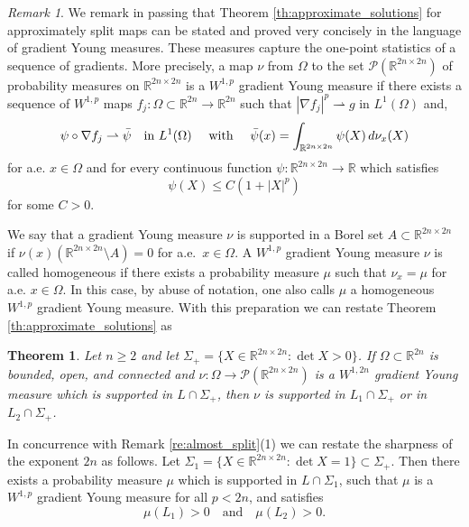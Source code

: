 \documentclass[titlepage]{amsart}
\numberwithin{equation}{section}
\theoremstyle{plain}
\newtheorem{theorem}[equation]{Theorem}
\theoremstyle{definition}
\theoremstyle{remark}
\newtheorem{remark}[equation]{Remark}
\newcommand{\R}{\mathbb{R}}
\newcommand{\g}{\nabla }
\begin{document}
\bigskip


\begin{remark}
We remark in passing that Theorem \ref{th:approximate_solutions} for approximately split maps can be stated  and proved very concisely in the language of  gradient 
Young measures.  These measures capture the one-point statistics of a sequence of gradients. More precisely, a map  $\nu$ from $\Omega$ to the set  $\mathcal P(\R^{2n \times 2n})$ of probability measures on $\R^{2n \times 2n}$
is a $W^{1,p}$ gradient Young measure if there exists a sequence of $W^{1,p}$ maps $f_j: \Omega \subset \R^{2n} \to \R^{2n}$ such
that  $|\g f_j|^p \rightharpoonup g$ in $L^1(\Omega)$ and,
$$  \psi \circ \g f_j \rightharpoonup \bar \psi \quad 
\text{in $L^1(\Omega)$ \quad  with  \quad $\bar \psi(x) = \int_{\R^{2n \times 2n}} \psi(X) \, d\nu_x(X)$}
$$
for a.e. $x \in \Omega$ and 
 for every continuous function $\psi: \R^{2n \times 2n} \to \R$ which satisfies
 $$ \psi(X) \le C (1 + |X|^p)$$
 for some $C > 0$.

We say that a gradient Young measure  $\nu$ is supported in a Borel set $A \subset \R^{2n \times 2n}$ if $\nu(x)(\R^{2n \times 2n} \setminus  A) = 0$ for a.e.\ $x \in \Omega$.
A $W^{1,p}$ gradient Young measure $\nu$ is called homogeneous if there exists a probability measure $\mu$ such that $\nu_x = \mu$ for a.e.
$x \in \Omega$. In this case, by abuse of notation, one also calls $\mu$ a homogeneous $W^{1,p}$ gradient Young measure. With this preparation we can restate Theorem \ref{th:approximate_solutions} as
\begin{theorem}   \label{th:hgym} 
Let $n \ge 2$ and let $\Sigma_+ = \{ X \in \R^{2n \times 2n} : \det X > 0 \}$.
If $\Omega \subset \R^{2n}$ is bounded, open, and connected and $\nu: \Omega \to \mathcal P(\R^{2n \times 2n})$ is a $W^{1, 2n}$
   gradient Young measure which is supported in $L \cap \Sigma_+$,
then $\nu$ is supported in $L_1  \cap \Sigma_+$
 or in $L_2  \cap \Sigma_+$.
\end{theorem}
In concurrence with Remark \ref{re:almost_split}(1) we can restate the sharpness of the exponent $2n$ as follows.
Let $\Sigma_1 = \{ X  \in \R^{2n \times 2n}: \det X = 1\} \subset \Sigma_+$. Then there exists a probability measure $\mu$ which is supported in $L \cap \Sigma_1$, such that $\mu$ is a   $W^{1,p}$ gradient Young measure for all $p < 2n$, and satisfies
$$ \mu(L_1) > 0 \quad \text{and} \quad \mu(L_2) > 0.$$
\end{remark}


\bigskip
\end{document}
